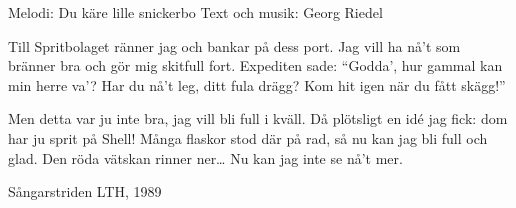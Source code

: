 \begin{song}

\begin{songmeta}
Melodi: Du käre lille snickerbo
Text och musik: Georg Riedel
\end{songmeta}

\begin{songtext}
Till Spritbolaget ränner jag
och bankar på dess port.
Jag vill ha nå't som bränner bra
och gör mig skitfull fort.
Expediten sade: \textquotedblleft{}Godda\textquoteright,
hur gammal kan min herre va'?
Har du nå't leg, ditt fula drägg?
Kom hit igen när du fått skägg!\textquotedblright{}

Men detta var ju inte bra,
jag vill bli full i kväll.
Då plötsligt en idé jag fick:
dom har ju sprit på Shell!
Många flaskor stod där på rad,
så nu kan jag bli full och glad.
Den röda vätskan rinner ner\ldots
Nu kan jag inte se nå\textquoteright{}t mer.
\end{songtext}

\begin{songnotes}
Sångarstriden LTH, 1989
\end{songnotes}

\end{song}
